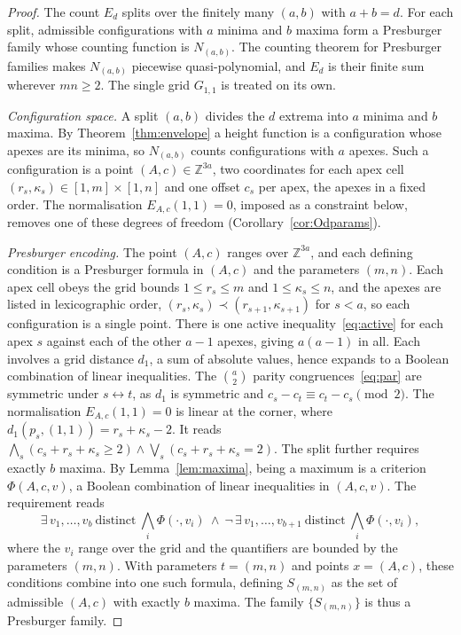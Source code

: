 \documentclass[11pt]{article}
\theoremstyle{definition}
\theoremstyle{remark}
\newcommand{\dgrid}{d_1}
\newcommand{\Z}{\mathbb{Z}}
\begin{document}
\begin{proof}
The count $E_d$ splits over the finitely many $(a,b)$ with $a+b=d$. For each split, admissible configurations with $a$ minima and $b$ maxima form a Presburger family whose counting function is $N_{(a,b)}$. The counting theorem for Presburger families makes $N_{(a,b)}$ piecewise quasi-polynomial, and $E_d$ is their finite sum wherever $mn\ge2$. The single grid $G_{1,1}$ is treated on its own.

\medskip\noindent\emph{Configuration space.}
A split $(a,b)$ divides the $d$ extrema into $a$ minima and $b$ maxima.
By Theorem~\ref{thm:envelope} a height
function is a configuration whose apexes are its minima, so $N_{(a,b)}$ counts
configurations with $a$ apexes. Such a
configuration is a point $(A,c)\in\Z^{3a}$, two coordinates for each apex cell
$(r_s,\kappa_s)\in[1,m]\times[1,n]$ and one offset $c_s$ per apex, the apexes in a fixed order. The
normalisation $E_{A,c}(1,1)=0$, imposed as a constraint below, removes one of
these degrees of freedom (Corollary~\ref{cor:Odparams}).

\medskip\noindent\emph{Presburger encoding.}
The point $(A,c)$ ranges over $\Z^{3a}$, and each defining condition is a Presburger formula in $(A,c)$ and the parameters $(m,n)$.
Each apex cell obeys the grid bounds $1\le r_s\le m$ and $1\le\kappa_s\le n$, and the apexes are listed in lexicographic order, $(r_s,\kappa_s)\prec(r_{s+1},\kappa_{s+1})$ for $s<a$, so each configuration is a single point.
There is one active inequality~\eqref{eq:active} for each apex $s$ against each of the other $a-1$ apexes, giving $a(a-1)$ in all. Each involves a grid distance $\dgrid$, a sum of absolute values, hence expands to a Boolean combination of linear inequalities.
The $\binom{a}{2}$ parity congruences~\eqref{eq:par} are symmetric under $s\leftrightarrow t$, as $\dgrid$ is symmetric and $c_s-c_t\equiv c_t-c_s\pmod 2$.
The normalisation $E_{A,c}(1,1)=0$ is linear at the corner, where $\dgrid(p_s,(1,1))=r_s+\kappa_s-2$. It reads $\bigwedge_s(c_s+r_s+\kappa_s\ge2)\wedge\bigvee_s(c_s+r_s+\kappa_s=2)$.
The split further requires exactly $b$ maxima. By
Lemma~\ref{lem:maxima}, being a maximum is a criterion $\Phi(A,c,v)$, a Boolean combination of linear inequalities in $(A,c,v)$. The requirement reads
\[
  \exists\,v_1,\dots,v_b\ \text{distinct}\ \textstyle\bigwedge_i\Phi(\cdot,v_i)
  \ \wedge\ \neg\,\exists\,v_1,\dots,v_{b+1}\ \text{distinct}\
  \textstyle\bigwedge_i\Phi(\cdot,v_i),
\]
where the $v_i$ range over the grid and the quantifiers are bounded by the parameters $(m,n)$. With parameters
$t=(m,n)$ and points $x=(A,c)$, these conditions combine into one such formula, defining $S_{(m,n)}$ as the set of admissible $(A,c)$ with exactly $b$ maxima. The family
$\{S_{(m,n)}\}$ is thus a Presburger family.


\end{proof}
\end{document}
